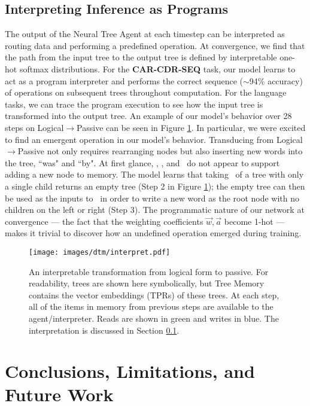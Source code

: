 \subsection{Interpreting Inference as Programs} \label{sec:dtm-interpret}
The output of the Neural Tree Agent at each timestep can be interpreted as routing data and performing a predefined operation. At convergence, we find that the path from the input tree to the output tree is defined by interpretable one-hot softmax distributions. For the \textbf{CAR-CDR-SEQ} task, our model learns to act as a program interpreter and performs the correct sequence ($\sim$94\% accuracy) of operations on subsequent trees throughout computation. For the language tasks, we can trace the program execution to see how the input tree is transformed into the output tree. An example of our model's behavior over 28 steps on Logical$\rightarrow$Passive can be seen in Figure \ref{fig:interpret}. In particular, we were excited to find an emergent operation in our model's behavior. Transducing from Logical$\rightarrow$Passive not only requires rearranging nodes but also inserting new words into the tree, ``was" and ``by". At first glance, \car, \cdr, and \cons\ do not appear to support adding a new node to memory. The model learns that taking \cdr\ of a tree with only a single child returns an empty tree (Step 2 in Figure \ref{fig:interpret}); the empty tree can then be used as the inputs to \cons\ in order to write a new word as the root node with no children on the left or right (Step 3). The programmatic nature of our network at convergence --- the fact that the weighting coefficients $\vec{w}, \vec{a}$ become 1-hot --- makes it trivial to discover how an undefined operation emerged during training.

\begin{figure}[]
\begin{center}
\centerline{\texttt{[image: images/dtm/interpret.pdf]}}
\caption{An interpretable transformation from logical form to passive. For readability, trees are shown here symbolically, but Tree Memory contains the vector embeddings (TPRs) of these trees. At each step, all of the items in memory from previous steps are available to the agent/interpreter. Reads are shown in green and writes in blue. The interpretation is discussed in Section \ref{sec:dtm-interpret}.}
\label{fig:interpret}
\end{center}
\vskip -0.2in
\end{figure}

\section{Conclusions, Limitations, and Future Work}

